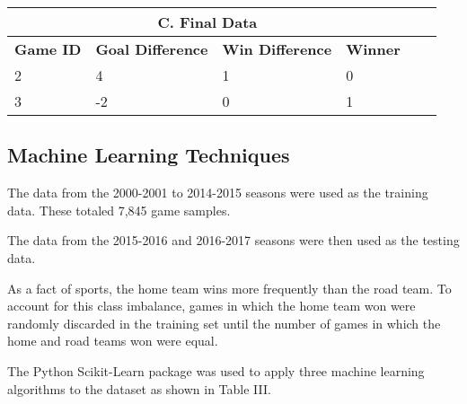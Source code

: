 \documentclass[letterpaper, 10 pt, conference]{ieeeconf}
\begin{document}
\begin{table}[h]
\begin{tabular}{@{}llllll@{}}
\multicolumn{4}{c}{\textbf{C. Final Data}}                                                                                                                                 \\\toprule
\multicolumn{1}{c}{\textbf{Game ID}} & \multicolumn{1}{c}{\textbf{Goal Difference}} & \multicolumn{1}{c}{\textbf{Win Difference}} & \multicolumn{1}{c}{\textbf{Winner}} \\\midrule
2                                    & 4                                            & 1                                           & 0                                   \\
3                                    & -2                                           & 0                                           & 1                                   \\ \bottomrule
\end{tabular}
\end{table}

\subsection{Machine Learning Techniques}

The data from the 2000-2001 to 2014-2015 seasons were used as the training data. These totaled 7,845 game samples.

The data from the 2015-2016 and 2016-2017 seasons were then used as the testing data.

As a fact of sports, the home team wins more frequently than the road team. To account for this class imbalance, games in which the home team won were randomly discarded in the training set until the number of games in which the home and road teams won were equal.

The Python Scikit-Learn package was used to apply three machine learning algorithms to the dataset as shown in Table III.
\end{document}

